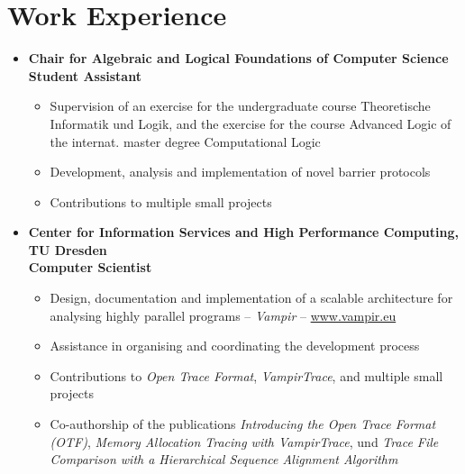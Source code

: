 



\pagestyle{empty}



\customhrule
\section*{Work Experience}
\begin{itemize}
	\item {}
		\textbf{Chair for Algebraic and Logical Foundations of Computer Science} \\
		\textbf{Student Assistant}
		\begin{itemize}
			\item Supervision of an exercise for the undergraduate course Theoretische Informatik und Logik, and the exercise for the course Advanced Logic of the internat. master degree Computational Logic
			\item Development, analysis and implementation of novel barrier protocols
			\item Contributions to multiple small projects
		\end{itemize}
	\item {}
		\textbf{Center for Information Services and High Performance Computing, TU Dresden} \\
		\textbf{Computer Scientist}
		\begin{itemize}
			\item Design, documentation and implementation of a scalable architecture for analysing highly parallel programs -- \emph{Vampir} -- \href{http://www.vampir.eu}{www.vampir.eu}
			\item Assistance in organising and coordinating the development process
			\item Contributions to \emph{Open Trace Format}, \emph{VampirTrace}, and multiple small projects
			\item Co-authorship of the publications \emph{Introducing the Open Trace Format (OTF)}, 
			\emph{Memory Allocation Tracing with VampirTrace}, und \emph{Trace File Comparison with a Hierarchical Sequence Alignment Algorithm}
		\end{itemize}
\end{itemize}

